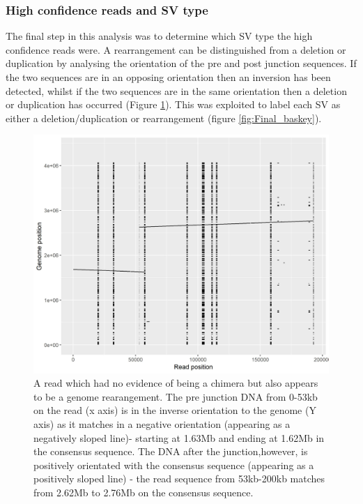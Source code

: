 \documentclass{article}
\begin{document}
\subsubsection{High confidence reads and SV type}

The final step in this analysis was to determine which SV type the high confidence reads were. A rearrangement can be distinguished from a deletion or duplication by analysing the orientation of the pre and post junction sequences. If the two sequences are in an opposing orientation then an inversion has been detected, whilst if the two sequences are in the same orientation then a deletion or duplication has occurred (Figure \ref{fig:Inv_are_possible}). This was exploited to label each SV as either a deletion/duplication or rearrangement (figure \ref{fig:Final_baskey}).
\begin{figure}[h!]
\centering
\includegraphics[width=\textwidth{}]{Chapter_2/Blast_results_381179.jpeg}
\caption{A read which had no evidence of being a chimera but also appears to be a genome rearangement. The pre junction DNA from 0-53kb on the read (x axis) is in the inverse orientation to the genome (Y axis) as it matches in a negative orientation (appearing as a negatively sloped line)- starting at 1.63Mb and ending at 1.62Mb in the consensus sequence. The DNA after the junction,however, is positively orientated with the consensus sequence (appearing as a positively sloped line) - the read sequence from 53kb-200kb matches from 2.62Mb to 2.76Mb on the consensus sequence. }
\label{fig:Inv_are_possible}
\end{figure}
\end{document}
